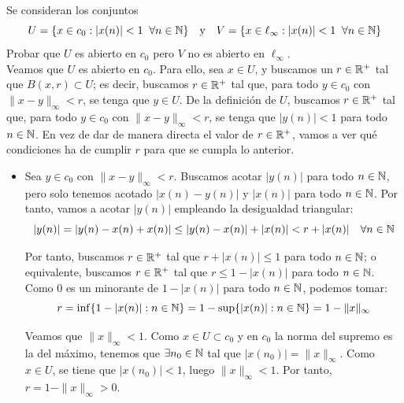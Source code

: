 \begin{ejercicio}
Se consideran los conjuntos
\[
U = \{x \in c_0 : |x(n)| < 1 \;\; \forall n \in \mathbb{N}\} \quad \text{y} \quad V = \{x \in \ell_\infty : |x(n)| < 1 \;\; \forall n \in \mathbb{N}\}
\]
Probar que $U$ es abierto en $c_0$ pero $V$ no es abierto en $\ell_\infty$.\\

Veamos que $U$ es abierto en $c_0$. Para ello, sea $x \in U$, y buscamos un $r\in \mathbb{R}^+$ tal que $B(x, r) \subset U$; es decir, buscamos $r\in \mathbb{R}^+$ tal que, para todo $y \in c_0$ con $\|x-y\|_\infty < r$, se tenga que $y \in U$. De la definición de $U$, buscamos $r\in \mathbb{R}^+$ tal que, para todo $y \in c_0$ con $\|x-y\|_\infty < r$, se tenga que $|y(n)| < 1$ para todo $n \in \mathbb{N}$. En vez de dar de manera directa el valor de $r\in \mathbb{R}^+$, vamos a ver qué condiciones ha de cumplir $r$ para que se cumpla lo anterior.
\begin{itemize}
    \item  Sea $y \in c_0$ con $\|x-y\|_\infty < r$. Buscamos acotar $|y(n)|$ para todo $n \in \mathbb{N}$, pero solo tenemos acotado $|x(n)-y(n)|$ y $|x(n)|$ para todo $n \in \mathbb{N}$. Por tanto, vamos a acotar $|y(n)|$ empleando la desigualdad triangular:
    \begin{equation*}
        |y(n)| = |y(n) - x(n) + x(n)| \leq |y(n) - x(n)| + |x(n)| < r + |x(n)| \quad \forall n \in \mathbb{N}
    \end{equation*}

    Por tanto, buscamos $r\in \mathbb{R}^+$ tal que $r + |x(n)| \leq 1$ para todo $n \in \mathbb{N}$; o equivalente, buscamos $r\in \mathbb{R}^+$ tal que $r \leq 1 - |x(n)|$ para todo $n \in \mathbb{N}$. Como $0$ es un minorante de $1 - |x(n)|$ para todo $n \in \mathbb{N}$, podemos tomar:
    \begin{equation*}
        r = \inf\{1 - |x(n)| : n \in \mathbb{N}\} = 1 - \sup\{|x(n)| : n \in \mathbb{N}\} = 1 - \|x\|_\infty
    \end{equation*}

    Veamos que $\|x\|_\infty < 1$. Como $x\in U\subset c_0$ y en $c_0$ la norma del supremo es la del máximo, tenemos que $\exists n_0 \in \mathbb{N}$ tal que $|x(n_0)| = \|x\|_\infty$. Como $x \in U$, se tiene que $|x(n_0)| < 1$, luego $\|x\|_\infty < 1$. Por tanto, $r = 1 - \|x\|_\infty > 0$.
\end{itemize}


\end{ejercicio}
